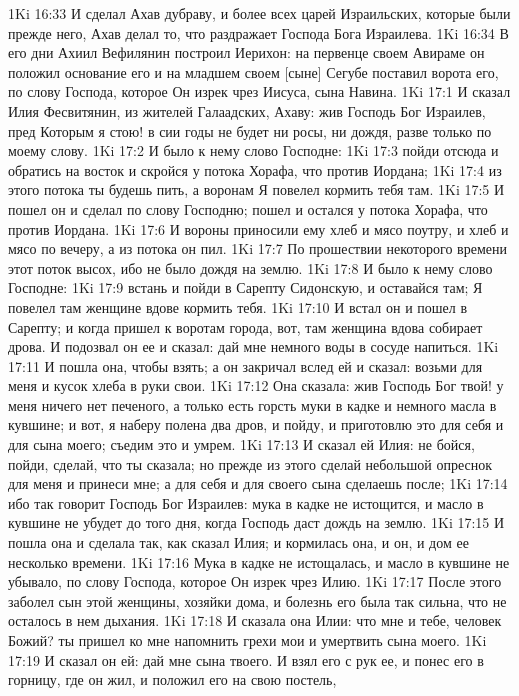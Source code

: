 1Ki 16:33  И сделал Ахав дубраву, и более всех царей Израильских, которые были прежде него, Ахав делал то, что раздражает Господа Бога Израилева.
1Ki 16:34  В его дни Ахиил Вефилянин построил Иерихон: на первенце своем Авираме он положил основание его и на младшем своем [сыне] Сегубе поставил ворота его, по слову Господа, которое Он изрек чрез Иисуса, сына Навина.
1Ki 17:1  И сказал Илия Фесвитянин, из жителей Галаадских, Ахаву: жив Господь Бог Израилев, пред Которым я стою! в сии годы не будет ни росы, ни дождя, разве только по моему слову.
1Ki 17:2  И было к нему слово Господне:
1Ki 17:3  пойди отсюда и обратись на восток и скройся у потока Хорафа, что против Иордана;
1Ki 17:4  из этого потока ты будешь пить, а воронам Я повелел кормить тебя там.
1Ki 17:5  И пошел он и сделал по слову Господню; пошел и остался у потока Хорафа, что против Иордана.
1Ki 17:6  И вороны приносили ему хлеб и мясо поутру, и хлеб и мясо по вечеру, а из потока он пил.
1Ki 17:7  По прошествии некоторого времени этот поток высох, ибо не было дождя на землю.
1Ki 17:8  И было к нему слово Господне:
1Ki 17:9  встань и пойди в Сарепту Сидонскую, и оставайся там; Я повелел там женщине вдове кормить тебя.
1Ki 17:10  И встал он и пошел в Сарепту; и когда пришел к воротам города, вот, там женщина вдова собирает дрова. И подозвал он ее и сказал: дай мне немного воды в сосуде напиться.
1Ki 17:11  И пошла она, чтобы взять; а он закричал вслед ей и сказал: возьми для меня и кусок хлеба в руки свои.
1Ki 17:12  Она сказала: жив Господь Бог твой! у меня ничего нет печеного, а только есть горсть муки в кадке и немного масла в кувшине; и вот, я наберу полена два дров, и пойду, и приготовлю это для себя и для сына моего; съедим это и умрем.
1Ki 17:13  И сказал ей Илия: не бойся, пойди, сделай, что ты сказала; но прежде из этого сделай небольшой опреснок для меня и принеси мне; а для себя и для своего сына сделаешь после;
1Ki 17:14  ибо так говорит Господь Бог Израилев: мука в кадке не истощится, и масло в кувшине не убудет до того дня, когда Господь даст дождь на землю.
1Ki 17:15  И пошла она и сделала так, как сказал Илия; и кормилась она, и он, и дом ее несколько времени.
1Ki 17:16  Мука в кадке не истощалась, и масло в кувшине не убывало, по слову Господа, которое Он изрек чрез Илию.
1Ki 17:17  После этого заболел сын этой женщины, хозяйки дома, и болезнь его была так сильна, что не осталось в нем дыхания.
1Ki 17:18  И сказала она Илии: что мне и тебе, человек Божий? ты пришел ко мне напомнить грехи мои и умертвить сына моего.
1Ki 17:19  И сказал он ей: дай мне сына твоего. И взял его с рук ее, и понес его в горницу, где он жил, и положил его на свою постель,
